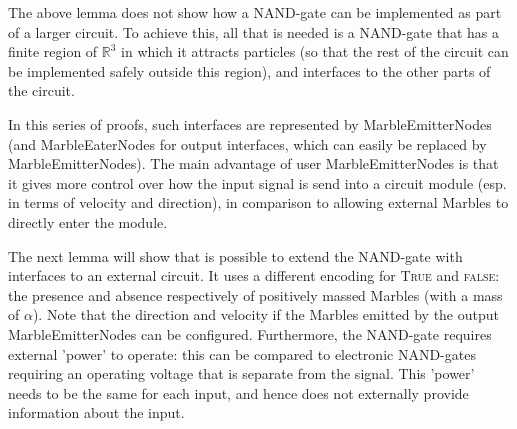 The above lemma does not show how a NAND-gate can be implemented as part of a larger circuit. To achieve this, all that is needed is a NAND-gate that has a finite region of $\mathbb{R}^3$ in which it attracts particles (so that the rest of the circuit can be implemented safely outside this region), and interfaces to the other parts of the circuit. 

In this series of proofs, such interfaces are represented by MarbleEmitterNodes (and MarbleEaterNodes for output interfaces, which can easily be replaced by MarbleEmitterNodes). The main advantage of user MarbleEmitterNodes is that it gives more control over how the input signal is send into a circuit module (esp. in terms of velocity and direction), in comparison to allowing external Marbles to directly enter the module.

The next lemma will show that is possible to extend the NAND-gate with interfaces to an external circuit. It uses a different encoding for \textsc{True} and \textsc{false}: the presence and absence respectively of positively massed Marbles (with a mass of $\alpha$). Note that the direction and velocity if the Marbles emitted by the output MarbleEmitterNodes can be configured. Furthermore, the NAND-gate requires external 'power' to operate: this can be compared to electronic NAND-gates requiring an operating voltage that is separate from the signal. This 'power' needs to be the same for each input, and hence does not externally provide information about the input.

